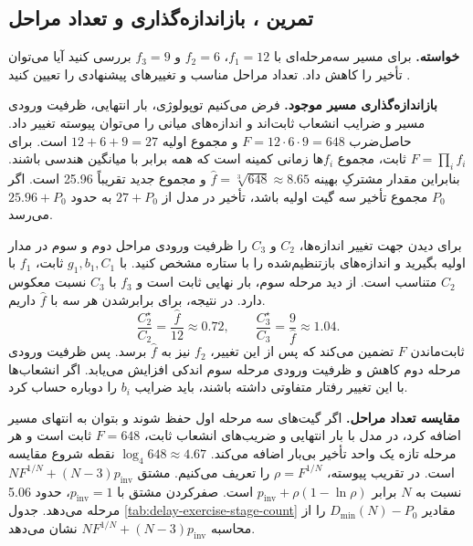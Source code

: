 \subsection{تمرین ، بازاندازه‌گذاری و تعداد مراحل}
\label{sec:delay-exercise-stage-count}

\textbf{خواسته.}
برای مسیر سه‌مرحله‌ای با \(f_1=12\)، \(f_2=6\) و \(f_3=9\)
بررسی کنید آیا می‌توان تأخیر را کاهش داد. تعداد مراحل مناسب و
تغییرهای پیشنهادی را تعیین کنید
\cite[تمرین ، صفحه ۱۷۷]{weste}.

\textbf{بازاندازه‌گذاری مسیر موجود.}
فرض می‌کنیم توپولوژی، بار انتهایی، ظرفیت ورودی مسیر و ضرایب
انشعاب ثابت‌اند و اندازه‌های میانی را می‌توان پیوسته تغییر داد.
حاصل‌ضرب \(F=12\cdot6\cdot9=648\) و مجموع اولیه
\(12+6+9=27\) است.
برای \(F=\prod_i f_i\) ثابت، مجموع \(f_i\)ها زمانی کمینه است
که همه برابر با میانگین هندسی باشند. بنابراین مقدار مشترکِ بهینه \(\widehat f=\sqrt[3]{648}\approx8.65\)
و مجموع جدید تقریباً \num{25.96} است. اگر \(P_0\) مجموع
تأخیر  سه گیت اولیه باشد، تأخیر در مدل از
\(27+P_0\) به حدود \(25.96+P_0\) می‌رسد.

برای دیدن جهت تغییر اندازه‌ها، \(C_2\) و \(C_3\) را ظرفیت
ورودی مراحل دوم و سوم در مدار اولیه بگیرید و اندازه‌های
بازتنظیم‌شده را با ستاره مشخص کنید. با \(g_1,b_1,C_1\)
ثابت، \(f_1\) با \(C_2\) متناسب است. از دید مرحله سوم،
بار نهایی ثابت است و \(f_3\) با \(C_3\) نسبت معکوس دارد.
در نتیجه، برای برابرشدن هر سه  با
\(\widehat f\) داریم.
\[
  \frac{C_2^\star}{C_2}=\frac{\widehat f}{12}\approx0.72,
  \qquad
  \frac{C_3^\star}{C_3}=\frac{9}{\widehat f}\approx1.04.
\]
ثابت‌ماندن \(F\) تضمین می‌کند که پس از این تغییر، \(f_2\)
نیز به \(\widehat f\) برسد. پس ظرفیت ورودی مرحله دوم
کاهش و ظرفیت ورودی مرحله سوم اندکی افزایش می‌یابد. اگر
انشعاب‌ها با این تغییر رفتار متفاوتی داشته باشند، باید
ضرایب \(b_i\) را دوباره حساب کرد.

\textbf{مقایسه تعداد مراحل.}
اگر گیت‌های سه مرحله اول حفظ شوند و بتوان به انتهای مسیر
 اضافه کرد،
در مدل با بار انتهایی و ضریب‌های انشعاب ثابت، \(F=648\) ثابت است و
هر مرحله تازه یک واحد تأخیر بی‌بار اضافه می‌کند.
\(\log_4 648\approx4.67\) نقطه شروع مقایسه است.
در تقریب پیوسته، \(\rho=F^{1/N}\) را تعریف می‌کنیم.
مشتق \(NF^{1/N}+(N-3)p_{\mathrm{inv}}\) نسبت به \(N\)
برابر \(p_{\mathrm{inv}}+\rho(1-\ln\rho)\) است.
صفرکردن مشتق با \(p_{\mathrm{inv}}=1\)، حدود \num{5.06} مرحله می‌دهد.
جدول \ref{tab:delay-exercise-stage-count} مقادیر
\(D_{\min}(N)-P_0\) را از
محاسبه \(NF^{1/N}+(N-3)p_{\mathrm{inv}}\) نشان می‌دهد.

